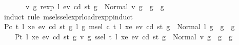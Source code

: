 \begin{isabellebody}
\ \ \ \ \ \ {\isasymLongrightarrow}\ {\isacharparenleft}{\kern0pt}{\isasymforall}v{}{\isacharprime}{\kern0pt}\ g{}{\isacharprime}{\kern0pt}{\isachardot}{\kern0pt}\ rexp\ l{}\ ev{}\ cd{}\ st{}\ g{}\ {\isacharequal}{\kern0pt}\ Normal\ {\isacharparenleft}{\kern0pt}v{}{\isacharprime}{\kern0pt}{\isacharcomma}{\kern0pt}\ g{}{\isacharprime}{\kern0pt}{\isacharparenright}{\kern0pt}\ {\isasymlongrightarrow}\ g{}{\isacharprime}{\kern0pt}\ {\isasymle}\ g{}{\isacharparenright}{\kern0pt}{\isachardoublequoteclose}\isanewline
%
\isadelimproof
%
\endisadelimproof
%
\isatagproof
{}\isamarkupfalse%
\ {\isacharparenleft}{\kern0pt}induct\ rule{\isacharcolon}{\kern0pt}\ msel{\isacharunderscore}{\kern0pt}ssel{\isacharunderscore}{\kern0pt}expr{\isacharunderscore}{\kern0pt}load{\isacharunderscore}{\kern0pt}rexp{\isachardot}{\kern0pt}pinduct\isanewline
{\isacharbrackleft}{\kern0pt}\ {\isacharquery}{\kern0pt}P{}{\isachardot}{\kern0pt}{}{\isacharequal}{\kern0pt}{\isachardoublequoteopen}{\isasymlambda}c{}\ t{}\ l{}\ xe{}\ ev{}\ cd{}\ st{}\ g{}{\isachardot}{\kern0pt}\ {\isacharparenleft}{\kern0pt}{\isasymforall}l{}{\isacharprime}{\kern0pt}\ g{}{\isacharprime}{\kern0pt}{\isachardot}{\kern0pt}\ msel\ c{}\ t{}\ l{}\ xe{}\ ev{}\ cd{}\ st{}\ g{}\ {\isacharequal}{\kern0pt}\ Normal\ {\isacharparenleft}{\kern0pt}l{}{\isacharprime}{\kern0pt}{\isacharcomma}{\kern0pt}\ g{}{\isacharprime}{\kern0pt}{\isacharparenright}{\kern0pt}\ {\isasymlongrightarrow}\ g{}{\isacharprime}{\kern0pt}\ {\isasymle}\ g{}{\isacharparenright}{\kern0pt}{\isachardoublequoteclose}\isanewline
\ \ \ \ {\isacharquery}{\kern0pt}P{}{\isachardot}{\kern0pt}{}{\isacharequal}{\kern0pt}{\isachardoublequoteopen}{\isasymlambda}t{}\ l{}\ xe{}\ ev{}\ cd{}\ st{}\ g{}{\isachardot}{\kern0pt}\ {\isacharparenleft}{\kern0pt}{\isasymforall}v{}{\isacharprime}{\kern0pt}\ g{}{\isacharprime}{\kern0pt}{\isachardot}{\kern0pt}\ ssel\ t{}\ l{}\ xe{}\ ev{}\ cd{}\ st{}\ g{}\ {\isacharequal}{\kern0pt}\ Normal\ {\isacharparenleft}{\kern0pt}v{}{\isacharprime}{\kern0pt}{\isacharcomma}{\kern0pt}\ g{}{\isacharprime}{\kern0pt}{\isacharparenright}{\kern0pt}\ {\isasymlongrightarrow}\ g{}{\isacharprime}{\kern0pt}\ {\isasymle}\ g{}{\isacharparenright}{\kern0pt}{\isachardoublequoteclose}\isanewline

\end{isabellebody}
